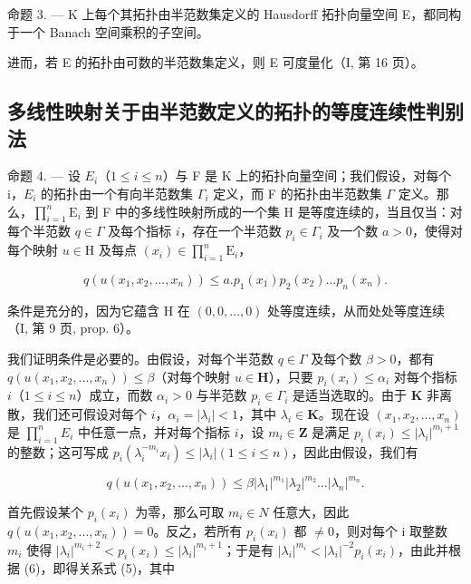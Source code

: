 命题 3. --- K 上每个其拓扑由半范数集定义的 Hausdorff 拓扑向量空间 E，都同构于一个 Banach 空间乘积的子空间。

进而，若 E 的拓扑由可数的半范数集定义，则 E 可度量化（I, 第 16 页）。

\subsection{多线性映射关于由半范数定义的拓扑的等度连续性判别法}

命题 4. --- 设 \(E_{i}\)（\(1 \leqslant i \leqslant n\)）与 F 是 K 上的拓扑向量空间；我们假设，对每个 i，\(E_{i}\) 的拓扑由一个有向半范数集 \(\Gamma_{i}\) 定义，而 F 的拓扑由半范数集 \(\Gamma\) 定义。那么，\(\prod_{i=1}^{n} \mathrm{E}_{i}\) 到 F 中的多线性映射所成的一个集 H 是等度连续的，当且仅当：对每个半范数 \(q \in \Gamma\) 及每个指标 \(i\)，存在一个半范数 \(p_{i} \in \Gamma_{i}\) 及一个数 \(a > 0\)，使得对每个映射 \(u \in \mathrm{H}\) 及每点 \((x_{i}) \in \prod_{i=1}^{n} \mathrm{E}_{i}\)，

\[
q \left(u \left(x _ {1}, x _ {2}, \dots , x _ {n}\right)\right) \leqslant a. p _ {1} \left(x _ {1}\right) p _ {2} \left(x _ {2}\right) \dots p _ {n} \left(x _ {n}\right).\tag{5}
\]

条件是充分的，因为它蕴含 H 在 \((0, 0, \ldots, 0)\) 处等度连续，从而处处等度连续（I, 第 9 页, prop. 6）。

我们证明条件是必要的。由假设，对每个半范数 \(q \in \Gamma\) 及每个数 \(\beta > 0\)，都有 \(q(u(x_1, x_2, ..., x_n)) \leqslant \beta\)（对每个映射 \(u \in \mathbf{H}\)），只要 \(p_i(x_i) \leqslant \alpha_i\) 对每个指标 \(i\)（\(1 \leqslant i \leqslant n\)）成立，而数 \(\alpha_i > 0\) 与半范数 \(p_i \in \Gamma_i\) 是适当选取的。由于 \(\mathbf{K}\) 非离散，我们还可假设对每个 \(i\)，\(\alpha_i = |\lambda_i| < 1\)，其中 \(\lambda_i \in \mathbf{K}\)。现在设 \((x_1, x_2, ..., x_n)\) 是 \(\prod_{i=1}^{n} E_i\) 中任意一点，并对每个指标 \(i\)，设 \(m_i \in \mathbf{Z}\) 是满足 \(p_i(x_i) \leqslant |\lambda_i|^{m_i + 1}\) 的整数；这可写成 \(p_i(\lambda_i^{-m_i} x_i) \leqslant |\lambda_i| (1 \leqslant i \leqslant n)\)，因此由假设，我们有

\[
q \left(u \left(x _ {1}, x _ {2}, \dots , x _ {n}\right)\right) \leqslant \beta \left| \lambda_ {1} \right| ^ {m _ {1}} \left| \lambda_ {2} \right| ^ {m _ {2}} \dots \left| \lambda_ {n} \right| ^ {m _ {n}}.\tag{6}
\]

首先假设某个 \(p_{i}(x_{i})\) 为零，那么可取 \(m_{i} \in N\) 任意大，因此 \(q(u(x_{1}, x_{2}, ..., x_{n})) = 0\)。反之，若所有 \(p_{i}(x_{i})\) 都 \(\neq 0\)，则对每个 i 取整数 \(m_{i}\) 使得 \(|\lambda_{i}|^{m_{i}+2} < p_{i}(x_{i}) \leqslant |\lambda_{i}|^{m_{i}+1}\)；于是有 \(|\lambda_{i}|^{m_{i}} < |\lambda_{i}|^{-2}p_{i}(x_{i})\)，由此并根据 (6)，即得关系式 (5)，其中

